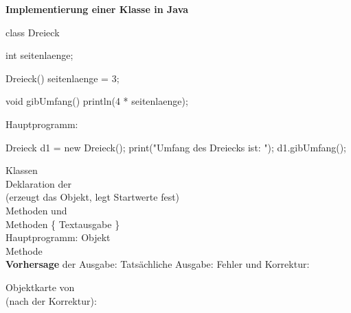 \documentclass[11pt,a4paper]{article}
\begin{document}

\textbf{Implementierung einer Klasse in Java} \hfill {}

\begin{minipage}[t]{0.53\linewidth}
\begin{java}
class Dreieck
{
   int seitenlaenge;

   Dreieck()
   {
      seitenlaenge = 3;
   }

   void gibUmfang()
   {
      println(4 * seitenlaenge);
   }
}
\end{java}
Hauptprogramm:
\begin{java}
Dreieck d1 = new Dreieck();
print("Umfang des Dreiecks ist: ");
d1.gibUmfang();
\end{java}
\end{minipage}\hfill
\begin{minipage}[t]{0.44\linewidth}
\vspace{0pt}\lueckentext
Klassen\\
Deklaration der \\
 (erzeugt das Objekt, legt Startwerte fest)\\
Methoden und\\
Methoden \{ Textausgabe \}\\
Hauptprogramm: Objekt \\
\phantom{Hauptprogramm:} Methode \\
\textbf{Vorhersage} der Ausgabe:
Tatsächliche Ausgabe:
Fehler und Korrektur:
\end{minipage}

\vspace{2mm}
\begin{minipage}[t]{0.4\linewidth}\vspace{0pt}
Objektkarte von \\(nach der Korrektur):
\end{minipage}\hfill
\begin{minipage}[t]{0.55\linewidth}\vspace{0pt}\raggedleft{}\end{minipage}
\end{document}
